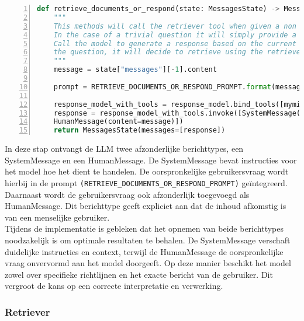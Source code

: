 \begin{lstlisting}[basicstyle=\small, frame=single, breaklines=true, postbreak=\mbox{\textcolor{red}{$\hookrightarrow$}\space}, escapeinside ={\%,}, escapechar={!}, numbers=left, language=Python, caption=Functie die beslist tussen direct antwoord en documentopvraging]
def retrieve_documents_or_respond(state: MessagesState) -> MessagesState:
    """
    This methods will call the retriever tool when given a non trivial question is asked.
    In the case of a trivial question it will simply provide a response
    Call the model to generate a response based on the current state. Given
    the question, it will decide to retrieve using the retriever tool, or simply respond to the user.
    """
    message = state["messages"][-1].content
    
    prompt = RETRIEVE_DOCUMENTS_OR_RESPOND_PROMPT.format(message=message)
    
    response_model_with_tools = response_model.bind_tools([myminfin_retriever_tool])
    response = response_model_with_tools.invoke([SystemMessage(content=prompt),
    HumanMessage(content=message)])
    return MessagesState(messages=[response])
\end{lstlisting}

In deze stap ontvangt de LLM twee afzonderlijke berichttypes, een SystemMessage en een HumanMessage. De SystemMessage bevat instructies voor het model hoe het dient te handelen. De oorspronkelijke gebruikersvraag wordt hierbij in de prompt \verb|(RETRIEVE_DOCUMENTS_OR_RESPOND_PROMPT)| geïntegreerd.
\\[1em]
Daarnaast wordt de gebruikersvraag ook afzonderlijk toegevoegd als HumanMessage. Dit berichttype geeft expliciet aan dat de inhoud afkomstig is van een menselijke gebruiker.
\\[1em]
Tijdens de implementatie is gebleken dat het opnemen van beide berichttypes noodzakelijk is om optimale resultaten te behalen. De SystemMessage verschaft duidelijke instructies en context, terwijl de HumanMessage de oorspronkelijke vraag onvervormd aan het model doorgeeft. Op deze manier beschikt het model zowel over specifieke richtlijnen en het exacte bericht van de gebruiker. Dit vergroot de kans op een correcte interpretatie en verwerking.

\subsubsection{Retriever}

